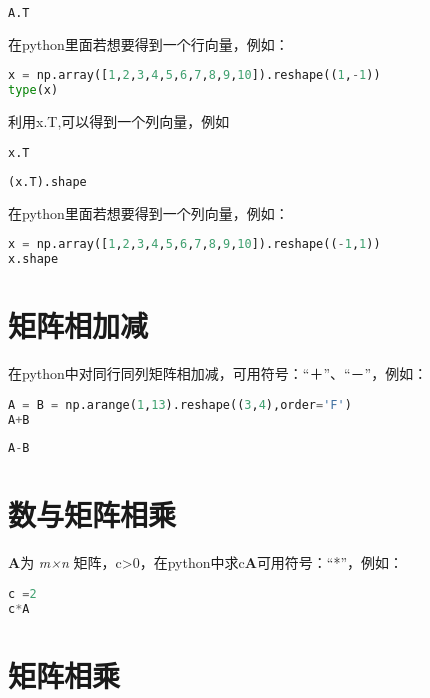 \documentclass[UTF8,a4paper,12pt]{ctexart}  %
\begin{document}
\begin{lstlisting}[language=Python]
A.T
\end{lstlisting}

在python里面若想要得到一个行向量，例如：

\begin{lstlisting}[language=Python]
x = np.array([1,2,3,4,5,6,7,8,9,10]).reshape((1,-1))
type(x)
\end{lstlisting}

利用x.T,可以得到一个列向量，例如

\begin{lstlisting}[language=Python]
x.T
\end{lstlisting}

\begin{lstlisting}[language=Python]
(x.T).shape
\end{lstlisting}

在python里面若想要得到一个列向量，例如：

\begin{lstlisting}[language=Python]
x = np.array([1,2,3,4,5,6,7,8,9,10]).reshape((-1,1))
x.shape
\end{lstlisting}

\section{矩阵相加减}

在python中对同行同列矩阵相加减，可用符号：``＋''、``－''，例如：

\begin{lstlisting}[language=Python]
A = B = np.arange(1,13).reshape((3,4),order='F')
A+B
\end{lstlisting}

\begin{lstlisting}[language=Python]
A-B
\end{lstlisting}

\section{数与矩阵相乘}

\textbf{A}为 \emph{m×n} 矩阵，c\textgreater{}0，在python中求c\textbf{A}可用符号：``*''，例如：

\begin{lstlisting}[language=Python]
c =2
c*A
\end{lstlisting}

\section{矩阵相乘}
\end{document}
